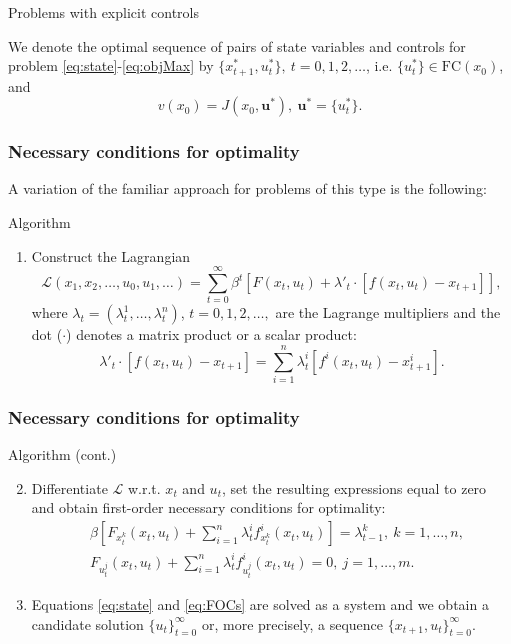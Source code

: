 \documentclass[10pt]{beamer}
\theoremstyle{definition}
\begin{document}
\begin{section}{Problems with explicit controls}
\begin{frame}[fragile]
We denote the optimal sequence of pairs of state variables and controls for problem \eqref{eq:state}-\eqref{eq:objMax} by $\{x^*_{t+1},u^*_t\},~t=0,1,2,\ldots$, i.e. $\{u^*_t\} \in \textrm{FC}(x_0)$, and $$v(x_0)=J(x_0,\mathbf{u^*}),~\mathbf{u^*}=\{u^*_t\}.$$
\end{frame}



\begin{frame}[fragile]
\frametitle{Necessary conditions for optimality}
A variation of the familiar approach for problems of this type is the following:
\begin{block}{Algorithm}
\begin{enumerate}
\item Construct the Lagrangian
\[\mathcal{L}(x_1,x_2,\ldots,u_0,u_1,\ldots) =
 \sum_{t=0}^{\infty}\beta^t \left[ F(x_t,u_t) + \lambda'_t \cdot
[f(x_t,u_t)-x_{t+1}] \right],  \] where $\lambda_t=(\lambda^1_t,\ldots,\lambda^n_t)$, $t=0,1,2,\ldots,$ are the Lagrange multipliers and the dot ($ \cdot $) denotes a matrix product or a scalar product: $$\lambda'_t \cdot [f(x_t,u_t)-x_{t+1}]
= \sum_{i=1}^n \lambda_t^i [f^i(x_t,u_t)-x^i_{t+1}].$$
\end{enumerate}
\end{block}
\end{frame}



\begin{frame}[fragile]
\frametitle{Necessary conditions for optimality}
\begin{block}{Algorithm (cont.)}
\begin{enumerate} \setcounter{enumi}{1}
\item Differentiate $\mathcal{L}$ w.r.t. $x_t$ and $u_t$, set the resulting expressions equal to zero and obtain first-order necessary conditions for optimality: \begin{equation}\begin{split}
& \beta \left[ F_{x_t^k}(x_t,u_t)+\sum_{i=1}^n \lambda_t^i f^i_{x_t^k}(x_t,u_t)\right] = \lambda^k_{t-1},~ k=1,\ldots,n, \\
& F_{u_t^j}(x_t,u_t)+ \sum_{i=1}^n \lambda_t^i f^i_{u_t^j}(x_t,u_t) = 0,~ j=1,\ldots,m.
\end{split}
\label{eq:FOCs}
\end{equation}
\item Equations \eqref{eq:state} and \eqref{eq:FOCs} are solved as a system and we obtain a candidate solution $\{u_t\}_{t=0}^\infty$ or, more precisely, a sequence
$\{x_{t+1},u_t\}_{t=0}^\infty$. 
\end{enumerate}
\end{block}\bigskip


\end{frame}
\end{section}
\end{document}
